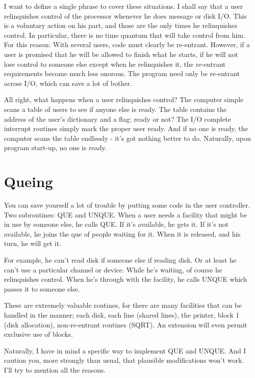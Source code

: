 \documentclass[b5paper, oneside]{book}
\begin{document}
I want to define a single phrase to cover these situations. I shall say that a user relinquishes control of the processor whenever he does message or disk I/O. This is a voluntary action on his part, and those are the only times he relinquishes control. In particular, there is no time quantum that will take control from him. For this reason: With several users, code must clearly be re-entrant. However, if a user is promised that he will be allowed to finish what he starts, if he will not lose control to someone else except when he relinquishes it, the re-entrant requirements become much less onorous. The program need only be re-entrant across I/O, which can save a lot of bother.

All right, what happens when a user relinquishes control? The computer simple scans a table of users to see if anyone else is ready. The table contains the address of the user's dictionary and a flag: ready or not? The I/O complete interrupt routines simply mark the proper user ready. And if no one is ready, the computer scans the table endlessly - it's got nothing better to do. Naturally, upon program start-up, no one is ready.

\section{Queing}
You can save yourself a lot of trouble by putting some code in the user controller. Two subroutines: QUE and UNQUE. When a user needs a facility that might be in use by someone else, he calls QUE. If it's available, he gets it. If it's not available, he joins the que of people waiting for it. When it is released, and his turn, he will get it.

For example, he can't read disk if someone else if reading disk. Or at least he can't use a particular channel or device. While he's waiting, of course he relinquishes control. When he's through with the facility, he calls UNQUE which passes it to someone else.

These are extremely valuable routines, for there are many facilities that can be handled in the manner; each disk, each line (shared lines), the printer, block 1 (disk allocation), non-re-entrant routines (SQRT). An extension will even permit exclusive use of blocks.

Naturally, I have in mind a specific way to implement QUE and UNQUE. And I caution you, more strongly than usual, that plausible modifications won't work. I'll try to mention all the reasons.
\end{document}
